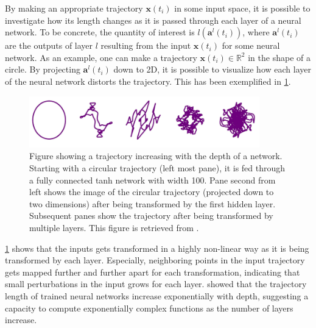 By making an appropriate trajectory $\boldsymbol{x}(t_i)$ in some input space, it is possible to investigate how its length changes as it is passed through each layer of a neural network. To be concrete, the quantity of interest is $l(\boldsymbol{a}^{l}(t_i))$, where $\boldsymbol{a}^{l}(t_i)$ are the outputs of layer $l$ resulting from the input $\boldsymbol{x}(t_i)$ for some neural network. As an example, one can make a trajectory $\boldsymbol{x}(t_i) \in \mathbb{R}^2$ in the shape of a circle. By projecting $\boldsymbol{a}^{l}(t_i)$ down to 2D, it is possible to visualize how each layer of the neural network distorts the trajectory. This has been exemplified in \cref{fig:trajectoryLengthExample}.

\begin{figure}[H]
    \centering
    \includegraphics[width=10cm]{latex/figures/trajectoryLengthExample.PNG}
    \caption{Figure showing a trajectory increasing with the depth
of a network. Starting with a circular trajectory (left most
pane), it is fed through a fully connected tanh network with
width 100. Pane second from left shows the image of the circular
trajectory (projected down to two dimensions) after being transformed by the first hidden layer. Subsequent panes show the trajectory after being transformed by multiple layers. This figure is retrieved from \citet{raghu2017expressive}.}
\label{fig:trajectoryLengthExample}
\end{figure}

\cref{fig:trajectoryLengthExample} shows that the inputs gets transformed in a highly non-linear way as it is being transformed by each layer. Especially, neighboring points in the input trajectory gets mapped further and further apart for each transformation, indicating that small perturbations in the input grows for each layer. \citet{raghu2017expressive} showed that the trajectory length of trained neural networks increase exponentially with depth, suggesting a capacity to compute exponentially complex functions as the number of layers increase.

